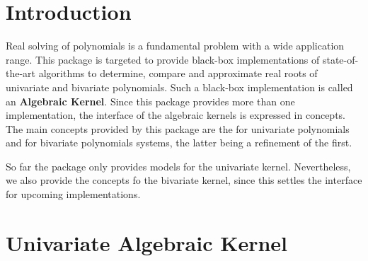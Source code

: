 
\section{Introduction}
Real solving of polynomials is a fundamental problem with a wide application range. 
This package is targeted to provide black-box implementations of state-of-the-art 
algorithms to determine, compare and approximate real roots of univariate and 
bivariate polynomials. Such a black-box implementation is called an {\bf Algebraic Kernel}. Since  
this package provides more than one implementation, the interface of the algebraic kernels 
is expressed in concepts. The main concepts provided by this package are the 
 for univariate polynomials and  
for bivariate polynomials systems, the latter being a refinement of the first. 

So far the package only provides models for the univariate kernel. Nevertheless, 
we also provide the concepts fo the bivariate kernel, since this settles the interface
for upcoming implementations.


\section{Univariate Algebraic Kernel}

